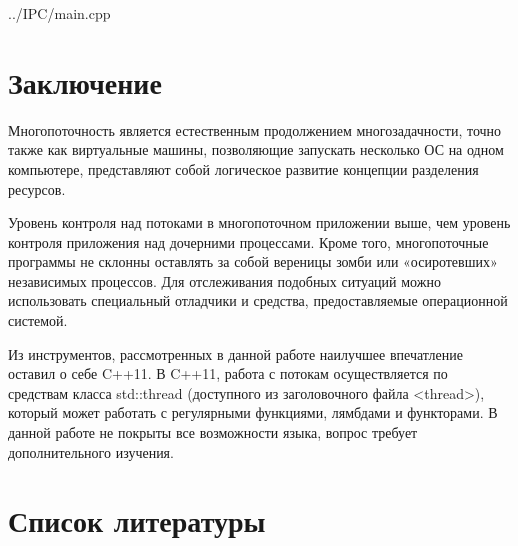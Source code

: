 \documentclass[a4paper, 12pt]{report}		%
\begin{document}

{../IPC/main.cpp}



\chapter*{Заключение}

Многопоточность является естественным продолжением многозадачности, точно также как виртуальные машины, позволяющие запускать несколько ОС на одном компьютере, представляют собой логическое развитие концепции разделения ресурсов.
\vspace{1em}

Уровень контроля над потоками в многопоточном приложении выше, чем уровень контроля приложения над дочерними процессами. Кроме того, многопоточные программы не склонны оставлять за собой вереницы зомби или «осиротевших» независимых процессов. Для отслеживания подобных ситуаций можно использовать специальный отладчики и средства, предоставляемые операционной системой.
\vspace{1em}

Из инструментов, рассмотренных в данной работе наилучшее впечатление оставил о себе C++11. В C++11, работа с потокам осуществляется по средствам класса std::thread (доступного из заголовочного файла <thread>), который может работать с регулярными функциями, лямбдами и функторами. В данной работе не покрыты все возможности языка, вопрос требует дополнительного изучения.


\chapter*{Список литературы}
\end{document}
